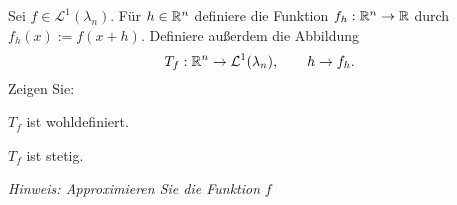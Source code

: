 \begin{Problem}
	Sei $f\in \mathcal{L}^1(\lambda_n)$. F\"{u}r $h\in \mathbb{R}^n$ definiere die Funktion $f_h:\mathbb{R}^n\to \mathbb{R}$ durch $f_h(x):=f(x+h)$. Definiere außerdem die Abbildung
	\[
	T_f:\mathbb{R}^n\to \mathcal{L}^1(\lambda_n),\qquad h\to f_h
	.\] 
	Zeigen Sie:
	\begin{parts}
		\item $T_f$ ist wohldefiniert.
		\item $T_f$ ist stetig.
	\end{parts}
{\footnotesize \emph{Hinweis: Approximieren Sie die Funktion }$f$ }
\end{Problem}
